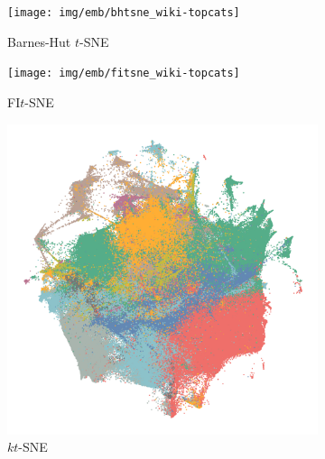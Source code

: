 \begin{appendix}
\begin{figure}[tbp]
  \centering
  \begin{subfigure}{0.45\linewidth}
    \centering
    \texttt{[image: img/emb/bhtsne\_wiki-topcats]}
    \caption{Barnes-Hut $t$-SNE}
  \end{subfigure}
\begin{subfigure}{0.45\linewidth}
  \centering
    \texttt{[image: img/emb/fitsne\_wiki-topcats]}
    \caption{FI$t$-SNE}
\end{subfigure}
\par\bigskip
\begin{subfigure}{0.45\linewidth}
  \centering
    \includegraphics[width=\linewidth]{img/emb/ktsne_wiki-topcats}
    \caption{$kt$-SNE}
\end{subfigure}
  \begin{subfigure}{0.45\linewidth}
    \centering

\end{subfigure}
\end{figure}
\end{appendix}
